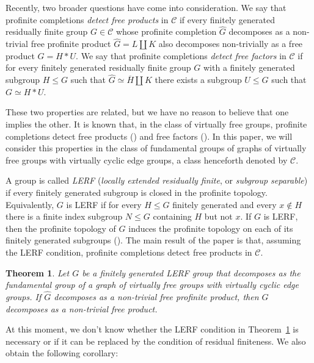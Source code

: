 \documentclass[a4paper]{amsart}
\newtheorem{teo}[lem]{Theorem}
\theoremstyle{definition}
\theoremstyle{remark}
\begin{document}
Recently, two broader questions have come into consideration. We say that profinite completions \emph{detect free products} in \(\mathcal{C}\) if every finitely generated residually finite group \(G \in \mathcal{C}\) whose profinite completion \(\widehat{G}\) decomposes as a non-trivial free profinite product \(\widehat{G} = L \amalg K\) also decomposes non-trivially as a free product \(G = H*U\). We say that profinite completions \emph{detect free factors} in \(\mathcal{C}\) if for every finitely generated residually finite group \(G\) with a finitely generated subgroup \(H \leq G\) such that \(\widehat{G} \simeq \overline{H} \amalg K\) there exists a subgroup \(U \leq G\) such that \(G \simeq H * U\). 

These two properties are related, but we have no reason to believe that one implies the other. It is known that, in the class of virtually free groups, profinite completions detect free products (\cite{BPZ22}) and free factors (\cite{garridoFreeFactorsProfinite2023}). In this paper, we will consider this properties in the class of fundamental groups of graphs of virtually free groups with virtually cyclic edge groups, a class  henceforth denoted by \(\mathcal{C}\).

A group is called \emph{LERF} (\emph{locally extended residually finite}, or \emph{subgroup separable}) if every finitely generated subgroup is closed in the profinite topology. Equivalently, \(G\) is LERF if for every \(H \leq G\) finitely generated and every \(x \not\in H\) there is a finite index subgroup \(N \leq G\) containing \(H\) but not \(x\). If \(G\) is LERF, then the profinite topology of \(G\) induces the profinite topology on each of its finitely generated subgroups (\cite[Lem. 11.1.4]{ribesProfiniteGraphsGroups2017}). The main result of the paper is that, assuming the LERF condition, profinite completions detect free products in \(\mathcal{C}\).

\begin{teo}\label{thm-detects-free-products} Let \(G\) be a finitely generated LERF group that decomposes as the fundamental group of a graph of virtually free groups with virtually cyclic edge groups. If \(\widehat{G}\) decomposes as a non-trivial free profinite product, then \(G\) decomposes as a non-trivial free product.
\end{teo}

At this moment, we don't know whether the LERF condition in Theorem~\ref{thm-detects-free-products} is necessary or if it can be replaced by the condition of residual finiteness.  We also obtain the following corollary:
\end{document}
